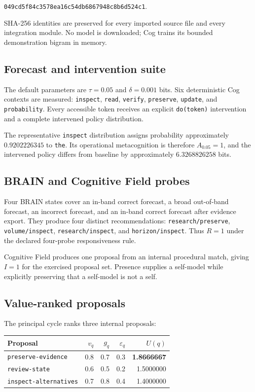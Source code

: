 \documentclass[11pt,a4paper]{article}
\begin{document}
\begin{center}
\texttt{049cd5f84c3578ea16c54db6867948c8b6d524c1}.
\end{center}

SHA-256 identities are preserved for every imported source file and every integration module. No model is downloaded; Cog trains its bounded demonstration bigram in memory.

\subsection{Forecast and intervention suite}
The default parameters are $\tau=0.05$ and $\delta=0.001$ bits. Six deterministic Cog contexts are measured: \texttt{inspect}, \texttt{read}, \texttt{verify}, \texttt{preserve}, \texttt{update}, and \texttt{probability}. Every accessible token receives an explicit \texttt{do(token)} intervention and a complete intervened policy distribution.

The representative \texttt{inspect} distribution assigns probability approximately $0.9202226345$ to \texttt{the}. Its operational metacognition is therefore $A_{0.05}=1$, and the intervened policy differs from baseline by approximately $6.3268826258$ bits.

\subsection{BRAIN and Cognitive Field probes}
Four BRAIN states cover an in-band correct forecast, a broad out-of-band forecast, an incorrect forecast, and an in-band correct forecast after evidence export. They produce four distinct recommendations: \texttt{research/preserve}, \texttt{volume/inspect}, \texttt{research/inspect}, and \texttt{horizon/inspect}. Thus $R=1$ under the declared four-probe responsiveness rule.

Cognitive Field produces one proposal from an internal procedural match, giving $I=1$ for the exercised proposal set. Presence supplies a self-model while explicitly preserving that a self-model is not a self.

\subsection{Value-ranked proposals}
The principal cycle ranks three internal proposals:

\begin{center}
\begin{tabular}{lrrrr}
\toprule
Proposal & $v_q$ & $g_q$ & $\varepsilon_q$ & $U(q)$ \\
\midrule
\texttt{preserve-evidence} & 0.8 & 0.7 & 0.3 & \textbf{1.8666667} \\
\texttt{review-state} & 0.6 & 0.5 & 0.2 & 1.5000000 \\
\texttt{inspect-alternatives} & 0.7 & 0.8 & 0.4 & 1.4000000 \\
\bottomrule
\end{tabular}
\end{center}
\end{document}
